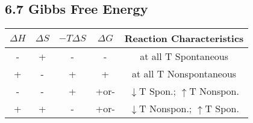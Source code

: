 \subsection{6.7 Gibbs Free Energy}

    
    \begin{center}
        \begin{tabular}{ |c|c|c|c|c| } 
         \hline
         $\Delta H$ & $\Delta S$ & $-T\Delta S$ & $\Delta G$ & Reaction Characteristics \\ 
         \hline
         - & + & - & - & at all T Spontaneous \\ 
         + & - & + & + & at all T Nonspontaneous \\ 
         - & - & + & +or- & $\downarrow$T Spon.; $\uparrow$T Nonspon.\\
         + & + & - & +or- & $\downarrow$T Nonspon.; $\uparrow$T Spon. \\
         \hline
        \end{tabular}
    \end{center}
    \vspace*{0.5em}